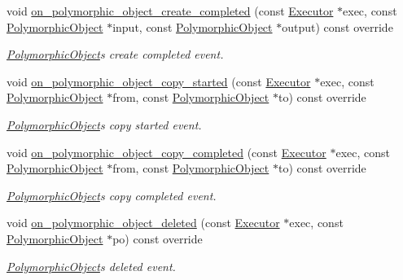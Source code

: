 \begin{DoxyCompactItemize}
void \hyperlink{classgko_1_1log_1_1Stream_a6ddaa3cdb5561b9abc01b97a88891b57}{on\+\_\+polymorphic\+\_\+object\+\_\+create\+\_\+completed} (const \hyperlink{classgko_1_1Executor}{Executor} $\ast$exec, const \hyperlink{classgko_1_1PolymorphicObject}{Polymorphic\+Object} $\ast$input, const \hyperlink{classgko_1_1PolymorphicObject}{Polymorphic\+Object} $\ast$output) const override
\begin{DoxyCompactList}\small\item\em \hyperlink{classgko_1_1PolymorphicObject}{Polymorphic\+Object}\textquotesingle{}s create completed event. \end{DoxyCompactList}\item 
void \hyperlink{classgko_1_1log_1_1Stream_ab2fdb58c80bd388df48ce1ac80e9f35e}{on\+\_\+polymorphic\+\_\+object\+\_\+copy\+\_\+started} (const \hyperlink{classgko_1_1Executor}{Executor} $\ast$exec, const \hyperlink{classgko_1_1PolymorphicObject}{Polymorphic\+Object} $\ast$from, const \hyperlink{classgko_1_1PolymorphicObject}{Polymorphic\+Object} $\ast$to) const override
\begin{DoxyCompactList}\small\item\em \hyperlink{classgko_1_1PolymorphicObject}{Polymorphic\+Object}\textquotesingle{}s copy started event. \end{DoxyCompactList}\item 
void \hyperlink{classgko_1_1log_1_1Stream_a71fdba2595d093b41bbd1b8b96b5c84a}{on\+\_\+polymorphic\+\_\+object\+\_\+copy\+\_\+completed} (const \hyperlink{classgko_1_1Executor}{Executor} $\ast$exec, const \hyperlink{classgko_1_1PolymorphicObject}{Polymorphic\+Object} $\ast$from, const \hyperlink{classgko_1_1PolymorphicObject}{Polymorphic\+Object} $\ast$to) const override
\begin{DoxyCompactList}\small\item\em \hyperlink{classgko_1_1PolymorphicObject}{Polymorphic\+Object}\textquotesingle{}s copy completed event. \end{DoxyCompactList}\item 
void \hyperlink{classgko_1_1log_1_1Stream_a2e2c904c50789d4a233202a2481ed6de}{on\+\_\+polymorphic\+\_\+object\+\_\+deleted} (const \hyperlink{classgko_1_1Executor}{Executor} $\ast$exec, const \hyperlink{classgko_1_1PolymorphicObject}{Polymorphic\+Object} $\ast$po) const override
\begin{DoxyCompactList}\small\item\em \hyperlink{classgko_1_1PolymorphicObject}{Polymorphic\+Object}\textquotesingle{}s deleted event. \end{DoxyCompactList}\item 

\end{DoxyCompactItemize}

